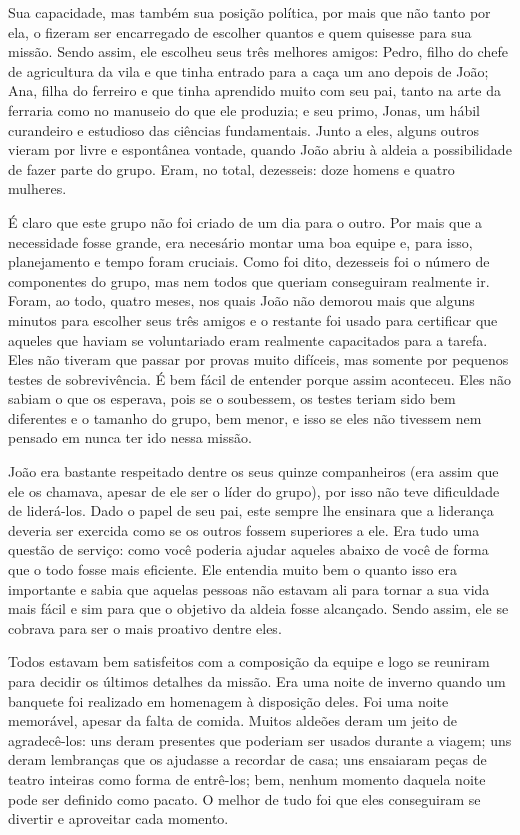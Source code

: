Sua capacidade, mas também sua posição política, por mais que não tanto por ela, o fizeram ser encarregado de escolher quantos e quem quisesse para sua missão. Sendo assim, ele escolheu seus três melhores amigos: Pedro, filho do chefe de agricultura da vila e que tinha entrado para a caça um ano depois de João; Ana, filha do ferreiro e que tinha aprendido muito com seu pai, tanto na arte da ferraria como no manuseio do que ele produzia; e seu primo, Jonas, um hábil curandeiro e estudioso das ciências fundamentais. Junto a eles, alguns outros vieram por livre e espontânea vontade, quando João abriu à aldeia a possibilidade de fazer parte do grupo. Eram, no total, dezesseis: doze homens e quatro mulheres.

É claro que este grupo não foi criado de um dia para o outro. Por mais que a necessidade fosse grande, era necesário montar uma boa equipe e, para isso, planejamento e tempo foram cruciais. Como foi dito, dezesseis foi o número de componentes do grupo, mas nem todos que queriam conseguiram realmente ir. Foram, ao todo, quatro meses, nos quais João não demorou mais que alguns minutos para escolher seus três amigos e o restante foi usado para certificar que aqueles que haviam se voluntariado eram realmente capacitados para a tarefa. Eles não tiveram que passar por provas muito difíceis, mas somente por pequenos testes de sobrevivência. É bem fácil de entender porque assim aconteceu. Eles não sabiam o que os esperava, pois se o soubessem, os testes teriam sido bem diferentes e o tamanho do grupo, bem menor, e isso se eles não tivessem nem pensado em nunca ter ido nessa missão.

João era bastante respeitado dentre os seus quinze companheiros (era assim que ele os chamava, apesar de ele ser o líder do grupo), por isso não teve dificuldade de liderá-los. Dado o papel de seu pai, este sempre lhe ensinara que a liderança deveria ser exercida como se os outros fossem superiores a ele. Era tudo uma questão de serviço: como você poderia ajudar aqueles abaixo de você de forma que o todo fosse mais eficiente. Ele entendia muito bem o quanto isso era importante e sabia que aquelas pessoas não estavam ali para tornar a sua vida mais fácil e sim para que o objetivo da aldeia fosse alcançado. Sendo assim, ele se cobrava para ser o mais proativo dentre eles.

Todos estavam bem satisfeitos com a composição da equipe e logo se reuniram para decidir os últimos detalhes da missão. Era uma noite de inverno quando um banquete foi realizado em homenagem à disposição deles. Foi uma noite memorável, apesar da falta de comida. Muitos aldeões deram um jeito de agradecê-los: uns deram presentes que poderiam ser usados durante a viagem; uns deram lembranças que os ajudasse a recordar de casa; uns ensaiaram peças de teatro inteiras como forma de entrê-los; bem, nenhum momento daquela noite pode ser definido como pacato. O melhor de tudo foi que eles conseguiram se divertir e aproveitar cada momento.

